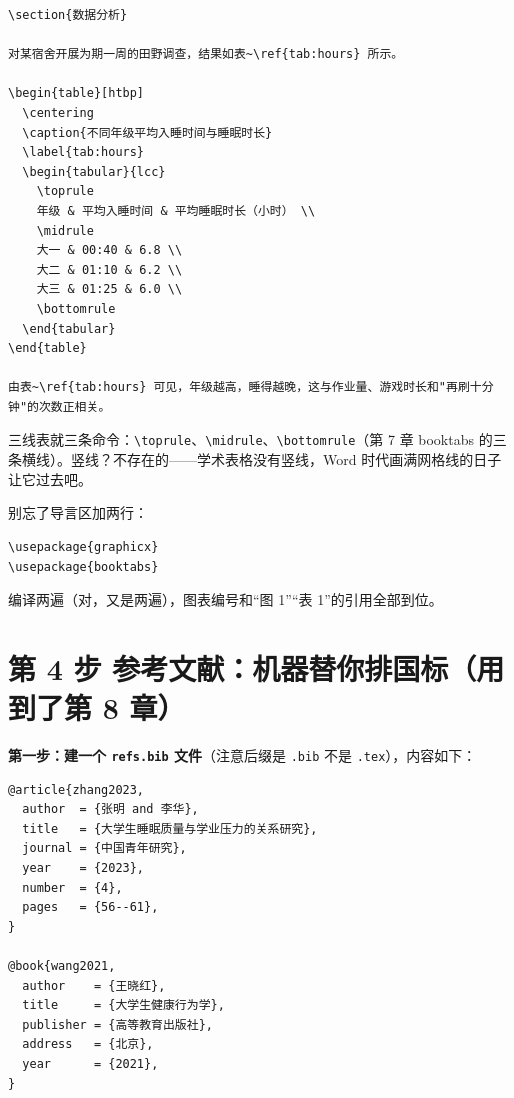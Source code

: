 \begin{lstlisting}
\section{数据分析}

对某宿舍开展为期一周的田野调查，结果如表~\ref{tab:hours} 所示。

\begin{table}[htbp]
  \centering
  \caption{不同年级平均入睡时间与睡眠时长}
  \label{tab:hours}
  \begin{tabular}{lcc}
    \toprule
    年级 & 平均入睡时间 & 平均睡眠时长（小时） \\
    \midrule
    大一 & 00:40 & 6.8 \\
    大二 & 01:10 & 6.2 \\
    大三 & 01:25 & 6.0 \\
    \bottomrule
  \end{tabular}
\end{table}

由表~\ref{tab:hours} 可见，年级越高，睡得越晚，这与作业量、游戏时长和"再刷十分钟"的次数正相关。
\end{lstlisting}

三线表就三条命令：\texttt{\textbackslash{}toprule}、\texttt{\textbackslash{}midrule}、\texttt{\textbackslash{}bottomrule}（第 7 章 booktabs 的三条横线）。竖线？不存在的——学术表格没有竖线，Word 时代画满网格线的日子让它过去吧。

别忘了导言区加两行：

\begin{lstlisting}
\usepackage{graphicx}
\usepackage{booktabs}
\end{lstlisting}

编译两遍（对，又是两遍），图表编号和“图 1”“表 1”的引用全部到位。

\section*{第 4 步 参考文献：机器替你排国标（用到了第 8 章）}

\textbf{第一步：建一个 \texttt{refs.bib} 文件}（注意后缀是 \texttt{.bib} 不是 \texttt{.tex}），内容如下：

\begin{lstlisting}
@article{zhang2023,
  author  = {张明 and 李华},
  title   = {大学生睡眠质量与学业压力的关系研究},
  journal = {中国青年研究},
  year    = {2023},
  number  = {4},
  pages   = {56--61},
}

@book{wang2021,
  author    = {王晓红},
  title     = {大学生健康行为学},
  publisher = {高等教育出版社},
  address   = {北京},
  year      = {2021},
}
\end{lstlisting}

